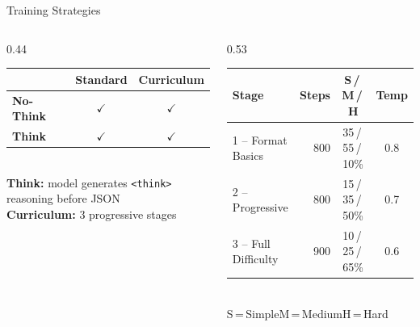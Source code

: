 \documentclass[10pt, aspectratio=169]{beamer}
\begin{document}
\begin{frame}{Training Strategies}
  \begin{columns}[T]
    \begin{column}{0.44\textwidth}
      \renewcommand{\arraystretch}{1.5}
      \begin{tabular}{@{}lcc@{}}
        \toprule
                          & \textbf{Standard} & \textbf{Curriculum} \\
        \midrule
        \textbf{No-Think} & $\checkmark$      & $\checkmark$ \\
        \textbf{Think}    & $\checkmark$      & $\checkmark$ \\
        \bottomrule
      \end{tabular}
      \vspace{0.7em}\\
      \small
      \textbf{Think:} model generates \texttt{<think>} reasoning before JSON\\[0.4em]
      \textbf{Curriculum:} 3 progressive stages
    \end{column}
    \begin{column}{0.53\textwidth}
      \small
      \renewcommand{\arraystretch}{1.35}
      \begin{tabular}{@{}lrcc@{}}
        \toprule
        \textbf{Stage}       & \textbf{Steps} & \textbf{S\,/\,M\,/\,H} & \textbf{Temp} \\
        \midrule
        1 – Format Basics    & 800  & 35\,/\,55\,/\,10\%  & 0.8 \\
        2 – Progressive      & 800  & 15\,/\,35\,/\,50\%  & 0.7 \\
        3 – Full Difficulty  & 900  & 10\,/\,25\,/\,65\%  & 0.6 \\
        \bottomrule
      \end{tabular}
      \vspace{0.3em}\\
      \small S\,=\,Simple\quad M\,=\,Medium\quad H\,=\,Hard
    \end{column}
  \end{columns}
\end{frame}
\end{document}
